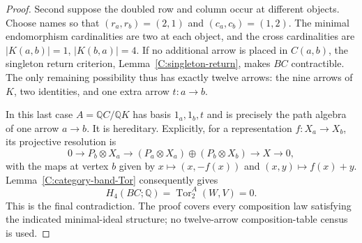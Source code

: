 \begin{proof}
Second suppose the doubled row and column occur at different
objects. Choose names so that $(r_a,r_b)=(2,1)$ and
$(c_a,c_b)=(1,2)$. The minimal endomorphism cardinalities
are two at each object, and the cross cardinalities are
$|K(a,b)|=1$, $|K(b,a)|=4$.
If no additional arrow is placed in $C(a,b)$, the singleton
return criterion, Lemma~\ref{C:singleton-return}, makes $BC$
contractible. The only remaining possibility thus has exactly
twelve arrows: the nine arrows of $K$, two identities, and
one extra arrow $t:a\to b$.

In this last case $A=\mathbb QC/\mathbb QK$ has basis
$1_a,1_b,t$ and is precisely the path algebra of one arrow
$a\to b$. It is hereditary. Explicitly, for a representation
$f:X_a\to X_b$, its projective resolution is
\[
 0\longrightarrow P_b\otimes X_a
 \longrightarrow(P_a\otimes X_a)\oplus(P_b\otimes X_b)
 \longrightarrow X\longrightarrow0,
\]
with the maps at vertex $b$ given by
$x\mapsto(x,-f(x))$ and $(x,y)\mapsto f(x)+y$.
Lemma~\ref{C:category-band-Tor} consequently gives
\[
 H_4(BC;\mathbb Q)=\operatorname{Tor}_2^A(W,V)=0.
\]
This is the final contradiction. The proof covers every
composition law satisfying the indicated minimal-ideal
structure; no twelve-arrow composition-table census is used.
\end{proof}
